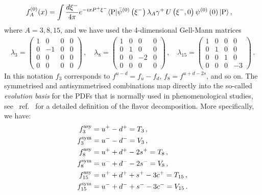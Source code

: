 \begin{eqnarray}
    \label{eq:fADef}
    f_A^{(0)}(x) &= \int \frac{d\xi^-}{4\pi} e^{-ixP^+\xi^-} 
	\langle \text{P}|\bar{\psi}^{(0)}\left(\xi^-\right) \lambda_A \gamma^+ \,   
	U\left(\xi^-,0\right) \psi^{(0)}\left( 0\right)  |\text{P}\rangle\, , 
\end{eqnarray}
where $A=3,8,15$, and we have used the 4-dimensional Gell-Mann matrices
\begin{eqnarray}
    \lambda_3=
    \begin{pmatrix}
        1 & 0 & 0 & 0\\
        0 & -1& 0 & 0\\
        0 & 0 & 0 & 0\\
        0 & 0 & 0 & 0
    \end{pmatrix}\, , \quad
    \lambda_8=
    \begin{pmatrix}
        1 & 0 & 0 & 0\\
        0 & 1& 0 & 0\\
        0 & 0 & -2 & 0\\
        0 & 0 & 0 & 0
    \end{pmatrix}\, , \quad
    \lambda_{15}=
    \begin{pmatrix}
        1 & 0 & 0 & 0\\
        0 & 1& 0 & 0\\
        0 & 0 & 1 & 0\\
        0 & 0 & 0 & -3
    \end{pmatrix}\, . 
\end{eqnarray}
In this notation $f_3$ corresponds to $f^{u-d}=f_u-f_d$, $f_8=f^{u+d-2s}$, and
so on. The symmetrised and antisymmetrised combinations map directly into the
so-called {\em evolution basis} for the PDFs that is normally used in
phenomenological studies, see \eg\ ref.~\cite{Vogt:2004ns} for a detailed
definition of the flavor decomposition. More specifically, we have:
\begin{align}
    f^{\mathrm{asy}}_{3}  &= u^+ - d^+ = T_3 \, , \\
    f^{\mathrm{sym}}_{3}  &= u^- - d^- = V_3 \, , \\
    f^{\mathrm{asy}}_{8}  &= u^+ + d^+ - 2 s^+ = T_8 \, , \\
    f^{\mathrm{sym}}_{8}  &= u^- + d^- - 2 s^- = V_8 \, , \\
    f^{\mathrm{asy}}_{15} &= u^+ + d^+ + s^+ - 3 c^+ = T_{15} \, , \\
    f^{\mathrm{sym}}_{15} &= u^- + d^- + s^- - 3 c^- = V_{15} \, .
\end{align}

